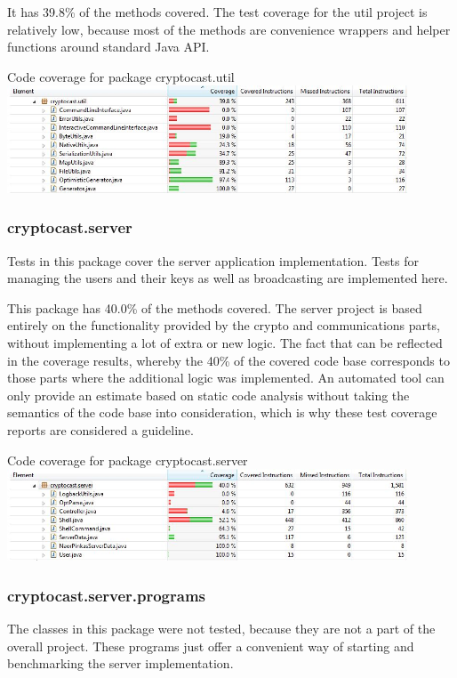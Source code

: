 \documentclass[a4paper,10pt]{scrartcl}
\begin{document}
It has 39.8\% of the methods covered. The test coverage for the util project is relatively low, because most of the methods are convenience wrappers and helper functions around standard Java API.

\begin{illustration}{Code coverage for package cryptocast.util}
\includegraphics[width=450px]{figures/images/util.jpg}
\end{illustration}
\subsubsection{cryptocast.server}
Tests in this package cover the server application implementation. Tests for managing the users and their keys as well as broadcasting are implemented here.

This package has 40.0\% of the methods covered. The server project is based entirely on the functionality provided by the crypto and communications parts, without implementing a lot of extra or new logic. The fact that can be reflected in the coverage results, whereby the 40\% of the covered code base corresponds to those parts where the additional logic was implemented. An automated tool can only provide an estimate based on static code analysis without taking the semantics of the code base into consideration, which is why these test coverage reports are considered a guideline.

\begin{illustration}{Code coverage for package cryptocast.server}
\includegraphics[width=450px]{figures/images/server.jpg}
\end{illustration}

\subsubsection{cryptocast.server.programs}
The classes in this package were not tested, because they are not a part of the overall project. These programs just offer a convenient way of starting and benchmarking the server implementation.
\end{document}
